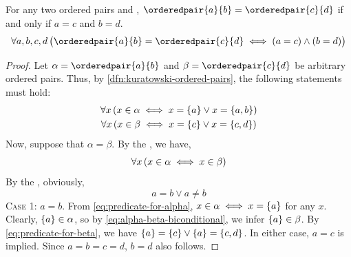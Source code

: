 \begin{thm}
    \label{thm:equality-of-ordered-pairs}
    For any two ordered pairs  and , \( \orderedpair{a}{b} = \orderedpair{c}{d} \)
    if and only if \( a = c \) and \( b = d \).
    \begin{equation*}
        \forall a,b,c,d \, \big( \orderedpair{a}{b} = \orderedpair{c}{d}
        \iff
        \mleft( a = c \mright) \land \mleft( b = d \mright) \big)
    \end{equation*}
\end{thm}

\begin{proof}
    Let \( \alpha = \orderedpair{a}{b} \) and \( \beta = \orderedpair{c}{d} \) be arbitrary ordered pairs.
    Thus, by \cref{dfn:kuratowski-ordered-pairs}, the following statements must hold:
    \begin{gather}
        \forall x \, \mleft( x \in \alpha \iff x = \mleft\{ a \mright\} \lor x = \mleft\{ a, b \mright\} \mright)
        \label{eq:predicate-for-alpha}\\
        \forall x \, \mleft( x \in \beta \iff x = \mleft\{ c \mright\} \lor x = \mleft\{ c, d \mright\} \mright) \label{eq:predicate-for-beta}
    \end{gather}
    Now, suppose that \( \alpha = \beta \). By the , we have,
    \begin{equation}
        \label{eq:alpha-beta-biconditional}
        \forall x \, \mleft( x \in \alpha \iff x \in \beta \mright)\\
    \end{equation}
    By the , obviously,
    \begin{equation*}
        a = b \lor a \neq b
    \end{equation*}
    {\scshape Case 1}: \( a = b \). From \eqref{eq:predicate-for-alpha},
    \( x \in \alpha \iff x = \mleft\{ a \mright\} \) for any \( x \).
    Clearly, \( \mleft\{ a \mright\} \in \alpha \),
    so by \eqref{eq:alpha-beta-biconditional}, we infer \( \mleft\{ a \mright\} \in \beta \).
    By \eqref{eq:predicate-for-beta}, we have \( \mleft\{ a \mright\} = \mleft\{ c \mright\} \lor \mleft\{ a \mright\} = \mleft\{ c, d \mright\} \).
    In either case, \( a = c \) is implied. Since \( a = b = c = d\), \( b = d \) also follows.


\end{proof}
